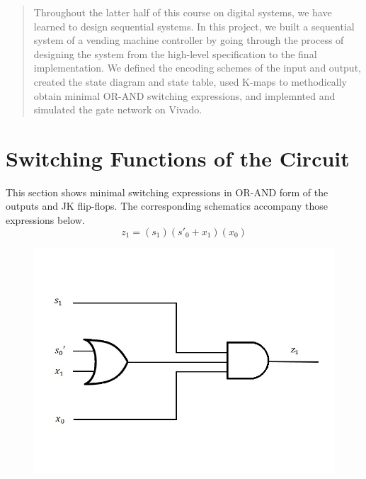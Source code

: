 \documentclass{article}
\begin{document}
\begin{abstract}
Throughout the latter half of this course on digital systems, we have learned 
to design sequential systems. In this project, we built a sequential system of 
a vending machine controller by going through the process of designing the 
system from the high-level specification to the final implementation. We 
defined the encoding schemes of the input and output, created the state 
diagram and state table, used K-maps to methodically obtain minimal OR-AND 
switching expressions, and implemnted and simulated the gate network on Vivado.
\end{abstract}


\section{Switching Functions of the Circuit}
This section shows minimal switching expressions in OR-AND form of the 
outputs and JK flip-flops. The corresponding schematics accompany those
expressions below.\\

\begin{equation*}
z_1 = (s_1)(s'_0 + x_1)(x_0)
\end{equation*}
\begin{figure}[h!]
\centering
\includegraphics[scale=0.3]{z1}
\end{figure}
\end{document}
